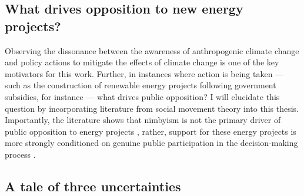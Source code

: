 \subsection{What drives opposition to new energy projects?}
Observing the dissonance between the awareness of anthropogenic climate change
and policy actions to mitigate the effects of climate change is one of the key
motivators for this work. Further, in instances where action is being taken ---
such as the construction of renewable energy projects following government
subsidies, for instance --- what drives public opposition? I will elucidate this
question by incorporating literature from social movement theory
\cite{mcadam_social_2017,mcadam_putting_2012} into this thesis. Importantly, the
literature shows that \ac{nimbyism} is not the primary driver of public
opposition to energy projects \cite{konisky_proximity_2021}, rather, support for
these energy projects is more strongly conditioned on genuine public
participation in the decision-making process
\cite{summers_influencing_2020,ottinger_procedural_2014,
walker_procedural_2017,barragan-contreras_procedural_2022,gonyo_resident_2021}.


\subsection{A tale of three uncertainties}
\label{section:three-uncertainties}

